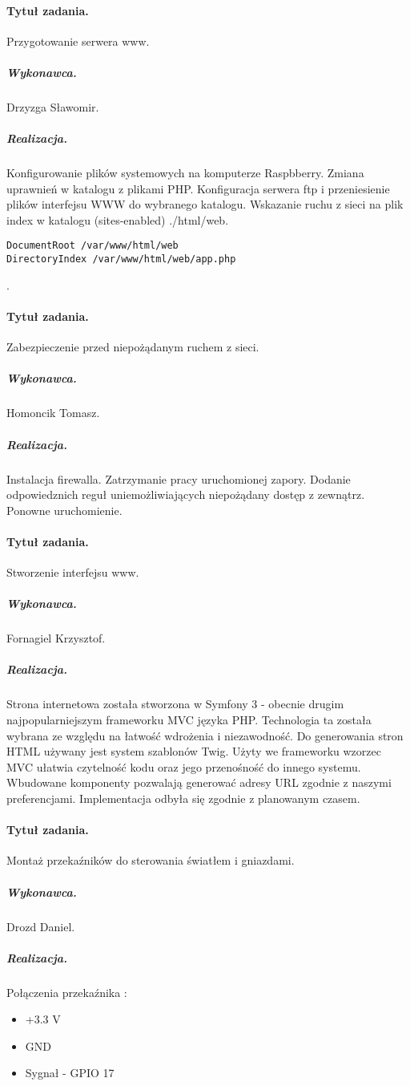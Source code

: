 	\paragraph{Tytuł zadania.} Przygotowanie serwera www.
\subparagraph{Wykonawca.} Drzyzga Sławomir.
\subparagraph{Realizacja.} 
Konfigurowanie plików systemowych na komputerze Raspbberry. Zmiana uprawnień w katalogu z plikami PHP. Konfiguracja serwera ftp i przeniesienie plików interfejsu WWW do wybranego katalogu. Wskazanie ruchu z sieci na plik index w katalogu (sites-enabled) ./html/web.
\begin{verbatim}
DocumentRoot /var/www/html/web
DirectoryIndex /var/www/html/web/app.php
\end{verbatim}.

	
	\paragraph{Tytuł zadania.} Zabezpieczenie przed niepożądanym ruchem z sieci.
	\subparagraph{Wykonawca.} Homoncik Tomasz.
	\subparagraph{Realizacja.} Instalacja firewalla. Zatrzymanie pracy uruchomionej zapory. Dodanie odpowiedznich reguł uniemożliwiających niepożądany dostęp z zewnątrz. Ponowne uruchomienie.
	
	\paragraph{Tytuł zadania.} Stworzenie interfejsu www.
	\subparagraph{Wykonawca.} Fornagiel Krzysztof.
	\subparagraph{Realizacja.} 
	Strona internetowa została stworzona w Symfony 3 - obecnie drugim najpopularniejszym frameworku MVC języka PHP. Technologia ta została wybrana ze względu na łatwość wdrożenia i niezawodność. Do generowania stron HTML używany jest system szablonów Twig. Użyty we frameworku wzorzec MVC ułatwia czytelność kodu oraz jego przenośność do innego systemu. Wbudowane komponenty pozwalają generować adresy URL zgodnie z naszymi preferencjami. Implementacja odbyła się zgodnie z planowanym czasem. 

	\paragraph{Tytuł zadania.} Montaż przekaźników do sterowania światłem i gniazdami.
	\subparagraph{Wykonawca.} Drozd Daniel.
	\subparagraph{Realizacja.}   
	
 Połączenia przekaźnika : 
 \begin{itemize}
 	\item +3.3 V
 	\item GND
 	\item Sygnał - GPIO 17
 \end{itemize}
	
